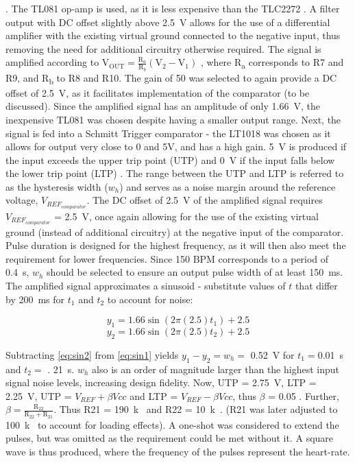 \cite{filter}. The TL081 op-amp is used, as it is less expensive than the TLC2272 \cite{octo}. A filter output with DC offset slightly above \SI{2.5}{V} allows for the use of a differential amplifier with the existing virtual ground connected to the negative input, thus removing the need for additional circuitry otherwise required. The signal is amplified according to $\mathrm{V}_{\mathrm{OUT}}=\frac{\mathrm{R}_{a}}{\mathrm{R}_{b}}\left(\mathrm{V}_{2}-\mathrm{V}_{1}\right)$ \cite{opamp}, where R\textsubscript{a} corresponds to R7 and R9, and R\textsubscript{b} to R8 and R10. The gain of 50 was selected to again provide a DC offset of \SI{2.5}{V}, as it facilitates implementation of the comparator (to be discussed). Since the amplified signal has an amplitude of only \SI{1.66}{V}, the inexpensive TL081 was chosen despite having a smaller output range. Next, the signal is fed into a Schmitt Trigger comparator - the LT1018 was chosen as it allows for output very close to 0 and 5V, and has a high gain. \SI{5}{V} is produced if the input exceeds the upper trip point (UTP) and \SI{0}{V} if the input falls below the lower trip point (LTP) \cite{schmitt}. The range between the UTP and LTP is referred to as the hysteresis width ($w_h$) and serves as a noise margin \cite{schmitt} around the reference voltage, $V_{REF_{comparator}}$. The DC offset of \SI{2.5}{V} of the amplified signal requires$V_{REF_{comparator}}$ = \SI{2.5}{V}, once again allowing for the use of the existing virtual ground (instead of additional circuitry) at the negative input of the comparator. Pulse duration is designed for the highest frequency, as it will then also meet the requirement for lower frequencies. Since 150 BPM corresponds to a period of \SI{0.4}{s}, $w_h$ should be selected to ensure an output pulse width of at least \SI{150}{ms}. The amplified signal approximates a sinusoid - substitute values of $t$ that differ by \SI{200}{ms} for $t_1$ and $t_2$ to account for noise:

\begin{equation}
y_1 = 1.66\sin(2\pi(2.5)t_1) + 2.5
\label{eq:sin1}
\end{equation}
\begin{equation}
y_2 = 1.66\sin(2\pi(2.5)t_2) + 2.5
\label{eq:sin2}
\end{equation}

Subtracting \ref{eq:sin2} from \ref{eq:sin1} yields $y_1 - y_2 = w_h =$ \SI{0.52}{V} for $t_1 =$\SI{0.01}{s} and $t_2 =$ \SI{.
21}{s}. $w_h$ also is an order of magnitude larger than the highest input signal noise levels, increasing design fidelity.  Now, UTP = \SI{2.75}{V}, LTP = \SI{2.25}{V}, UTP = $V_{REF} + \beta Vcc$ and LTP = $V_{REF} - \beta Vcc$, thus $\beta$ = 0.05 \cite{schmitt}. Further, $\beta=\frac{\mathrm{R}_{22}}{\mathrm{R}_{22}+\mathrm{R}_{21}}$. Thus R21 = \SI{190}{k\Omega} and R22 = \SI{10}{k\Omega}. (R21 was later adjusted to \SI{100}{k\Omega} to account for loading effects). A one-shot was considered to extend the pulses, but was omitted as the requirement could be met without it. A square wave is thus produced, where the frequency of the pulses represent the heart-rate.\\

